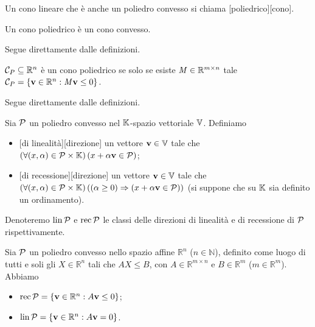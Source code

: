 \begin{Definition}
	Un cono lineare che \`e anche un poliedro convesso si chiama [poliedrico][cono].
\end{Definition}
\begin{Theorem}
	Un cono poliedrico \`e un cono convesso.
\end{Theorem}
\Proof Segue direttamente dalle definizioni. \EndProof
\begin{Theorem}
	$\mathcal{C}_P \subseteq \mathbb{R}^n$ \`e un cono poliedrico se solo se esiste $\mathit{M} \in \mathbb{R}^{m \times n}$ tale $\mathcal{C}_P = \lbrace \mathbf{v} \in \mathbb{R}^n : \mathit{M} \mathbf{v} \leq 0\rbrace$.
\end{Theorem}
\Proof Segue direttamente dalle definizioni. \EndProof
\begin{Definition}
	Sia $\mathcal{P}$ un poliedro convesso nel $\mathbb{K}$-spazio vettoriale $\mathbb{V}$. Definiamo
	\begin{itemize}
		\item {}[di linealit\`a][direzione] un vettore $\mathbf{v} \in \mathbb{V}$ tale che $\left ( \forall (x,\alpha) \in \mathcal{P} \times \mathbb{K} \right ) \left ( x + \alpha\mathbf{v} \in \mathcal{P} \right )$;
		\item {}[di recessione][direzione] un vettore $\mathbf{v} \in \mathbb{V}$ tale che $\left ( \forall (x,\alpha) \in \mathcal{P} \times \mathbb{K} \right ) \left ( \left ( \alpha \geq 0 \right ) \Rightarrow \left ( x + \alpha\mathbf{v} \in \mathcal{P} \right ) \right )$ (si suppone che su $\mathbb{K}$ sia definito un ordinamento).
	\end{itemize}
	Denoteremo $\operatorname{lin}{\mathcal{P}}$ e $\operatorname{rec}{\mathcal{P}}$ le classi delle direzioni di linealit\`a e di recessione di $\mathcal{P}$ rispettivamente.
\end{Definition}
\begin{Theorem}
	Sia $\mathcal{P}$ un poliedro convesso nello spazio affine $\mathbb{R}^n$ ($n \in \mathbb{N}$), definito come luogo di tutti e soli gli $X \in \mathbb{R}^n$ tali che $AX \leq B$, con $A \in \mathbb{R}^{m \times n}$ e $B \in \mathbb{R}^m$ ($m \in \mathbb{R}^m$). Abbiamo
	\begin{itemize}
		\item $\operatorname{rec}{\mathcal{P}} = \lbrace \mathbf{v} \in \mathbb{R}^n: A\mathbf{v} \leq 0 \rbrace$;
		\item $\operatorname{lin}{\mathcal{P}} = \lbrace \mathbf{v} \in \mathbb{R}^n: A\mathbf{v} = 0 \rbrace$.
	\end{itemize}
\end{Theorem}
